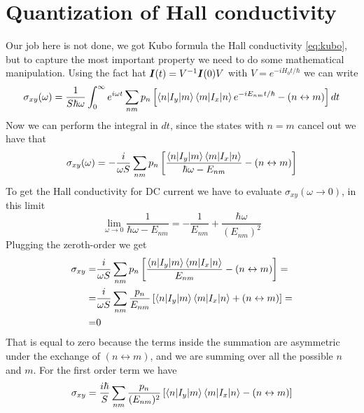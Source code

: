\section{Quantization of Hall conductivity}
Our job here is not done, we got Kubo formula the Hall conductivity \ref{eq:kubo}, but to capture the most important property we need to do some mathematical manipulation. Using the fact hat $\boldsymbol{I}(t)=V^{-1}\boldsymbol{I}(0) V$ with $V=e^{-iH_0t/\hbar}$ we can write
\[
    \sigma_{xy}(\omega)=\frac 1{S\hbar \omega}\int_0^{\infty}e^{i\omega t}\sum_{nm}p_n
    \left[
        \braket{n|I_y}{m}\braket{m|I_x}{n}e^{-iE_{nm}t/\hbar}-(n\leftrightarrow m) %
    \right]
    dt
\]
Now we can perform the integral in $dt$, since the states with $n=m$ cancel out we have that
\begin{equation}
    \sigma_{xy}(\omega)=-\frac i{\omega S} \sum_{nm}p_n\left[
        \frac{\braket{n|I_y}{m}\braket{m|I_x}{n}}{\hbar \omega - E_{nm}} - (n\leftrightarrow m)
    \right]
\end{equation}
To get the Hall conductivity for DC current we have to evaluate $\sigma_{xy}(\omega\to 0)$, in this limit
\[
    \lim_{\omega\to 0}\frac{1}{\hbar \omega-E_{nm}}=-\frac 1{E_{nm}}+\frac{\hbar \omega}{(E_{nm})^2}    
\]
Plugging the zeroth-order we get
\begin{equation}
    \begin{split}
    \sigma_{xy}=&\frac i{\omega S} \sum_{nm}p_n\left[
        \frac{\braket{n|I_y}{m}\braket{m|I_x}{n}}{E_{nm}} - (n\leftrightarrow m)
    \right]= \\
    =&\frac i{\omega S}\sum_{nm}\frac{p_n}{E_{nm}}\left[
        \braket{n|I_y}{m}\braket{m|I_x}{n} + (n\leftrightarrow m)
    \right]=\\
    =&0
    \end{split}
\end{equation}
That is equal to zero because the terms inside the summation are asymmetric under the exchange of $(n\leftrightarrow m)$, and we are summing over all the possible $n$ and $m$. For the first order term we have
\begin{equation}
    \sigma_{xy}=\frac{i\hbar}S\sum_{nm}\frac{p_n}{(E_{nm})^2}\left[
        \braket{n|I_y}{m}\braket{m|I_x}{n} - (n\leftrightarrow m)
    \right]
    \label{eq:kkubo}
\end{equation}

